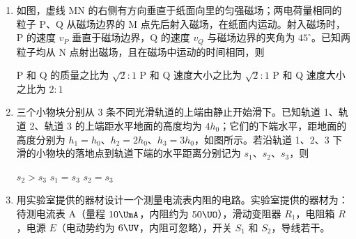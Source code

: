 \documentclass[\gkver]{gaokaozhenti}
\begin{document}
\begin{enumerate}
\item
如图，虚线 MN 的右侧有方向垂直于纸面向里的匀强磁场；两电荷量相同的粒子 P、Q 从磁场边界的 M 点先后射入磁场，在纸面内运动。射入磁场时，P 的速度 $v_P$ 垂直于磁场边界，Q 的速度 $v_Q$ 与磁场边界的夹角为 $45^{\circ}$。已知两粒子均从 N 点射出磁场，且在磁场中运动的时间相同，则


{P 和 Q 的质量之比为 $\sqrt{2}:1$}
{P 和 Q 速度大小之比为 $\sqrt{2}:1$}
{P 和 Q 速度大小之比为 $2:1$}


\item
三个小物块分别从 3 条不同光滑轨道的上端由静止开始滑下。已知轨道 1、轨道 2、轨道 3 的上端距水平地面的高度均为 $4h_0$；它们的下端水平，距地面的高度分别为 $h_1=h_0$、$h_2=2h_0$、$h_3=3h_0$，如图所示。若沿轨道 1、2、3 下滑的小物块的落地点到轨道下端的水平距离分别记为 $s_1$、$s_2$、$s_3$，则


{$s_2>s_3$}
{$s_1=s_3$}
{$s_2=s_3$}


\item
用实验室提供的器材设计一个测量电流表内阻的电路。实验室提供的器材为：待测电流表 A（量程 $10\UmA$，内阻约为 $50\UO$），滑动变阻器 $R_1$，电阻箱 $R$，电源 $E$（电动势约为 $6\UV$，内阻可忽略），开关 $S_1$ 和 $S_2$，导线若干。


\end{enumerate}
\end{document}
